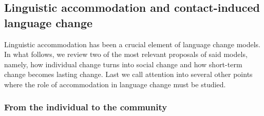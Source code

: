 \documentclass[output=paper,
modfonts
]{langscibook}
\begin{document}
\subsection{Linguistic accommodation and contact-induced language change}
% 
% 
% 
%
Linguistic accommodation has been a crucial element of language change models. In what follows, we review two of the most relevant proposals of said models, namely, how individual change turns into social change and how short-term change becomes lasting change. Last we call attention into several other points where the role of accommodation in language change must be studied.
\subsubsection*{From the individual to the community}
\end{document}
